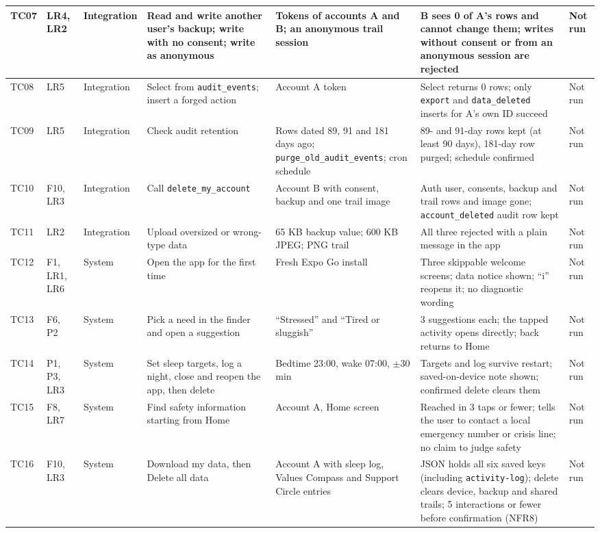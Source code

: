 \documentclass{article}
\begin{document}
{\begin{longtable}{|L{0.95cm}|L{1.35cm}|L{1.55cm}|L{3.0cm}|L{2.75cm}|L{3.85cm}|L{1.1cm}|}
TC07 & LR4, LR2 & Integration & Read and write another user's backup; write with no consent; write as anonymous & Tokens of accounts A and B; an anonymous trail session & B sees 0 of A's rows and cannot change them; writes without consent or from an anonymous session are rejected & Not run \\ \hline
TC08 & LR5 & Integration & Select from \texttt{audit\_events}; insert a forged action & Account A token & Select returns 0 rows; only \texttt{export} and \texttt{data\_deleted} inserts for A's own ID succeed & Not run \\ \hline
TC09 & LR5 & Integration & Check audit retention & Rows dated 89, 91 and 181 days ago; \texttt{purge\_old\_audit\_events}; cron schedule & 89- and 91-day rows kept (at least 90 days), 181-day row purged; schedule confirmed & Not run \\ \hline
TC10 & F10, LR3 & Integration & Call \texttt{delete\_my\_account} & Account B with consent, backup and one trail image & Auth user, consents, backup and trail rows and image gone; \texttt{account\_deleted} audit row kept & Not run \\ \hline
TC11 & LR2 & Integration & Upload oversized or wrong-type data & 65 KB backup value; 600 KB JPEG; PNG trail & All three rejected with a plain message in the app & Not run \\ \hline
TC12 & F1, LR1, LR6 & System & Open the app for the first time & Fresh Expo Go install & Three skippable welcome screens; data notice shown; ``i'' reopens it; no diagnostic wording & Not run \\ \hline
TC13 & F6, P2 & System & Pick a need in the finder and open a suggestion & ``Stressed'' and ``Tired or sluggish'' & 3 suggestions each; the tapped activity opens directly; back returns to Home & Not run \\ \hline
TC14 & P1, P3, LR3 & System & Set sleep targets, log a night, close and reopen the app, then delete & Bedtime 23:00, wake 07:00, $\pm$30 min & Targets and log survive restart; saved-on-device note shown; confirmed delete clears them & Not run \\ \hline
TC15 & F8, LR7 & System & Find safety information starting from Home & Account A, Home screen & Reached in 3 taps or fewer; tells the user to contact a local emergency number or crisis line; no claim to judge safety & Not run \\ \hline
TC16 & F10, LR3 & System & Download my data, then Delete all data & Account A with sleep log, Values Compass and Support Circle entries & JSON holds all six saved keys (including \texttt{activity-log}); delete clears device, backup and shared trails; 5 interactions or fewer before confirmation (NFR8) & Not run \\ \hline

\end{longtable}}
\end{document}
